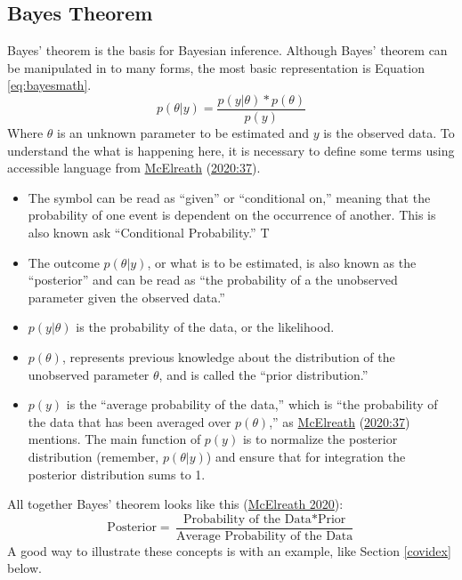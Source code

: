 \documentclass[12pt,twoside]{reedthesis}
\begin{document}
\hypertarget{bayesthe}{%
\subsection{Bayes Theorem}\label{bayesthe}}

Bayes' theorem is the basis for Bayesian inference. Although Bayes' theorem can be manipulated in to many forms, the most basic representation is Equation \eqref{eq:bayesmath}.
\begin{equation}
p(\theta|y) = \frac{ p(y|\theta) * p(\theta)}{p(y)}
\label{eq:bayesmath}
\end{equation}
Where \(\theta\) is an unknown parameter to be estimated and \(y\) is the observed data. To understand the what is happening here, it is necessary to define some terms using accessible language from \protect\hyperlink{ref-mcelreath2020}{McElreath} (\protect\hyperlink{ref-mcelreath2020}{2020:37}).
\begin{itemize}
\item
  The symbol \textbar{} can be read as ``given'' or ``conditional on,'' meaning that the probability of one event is dependent on the occurrence of another. This is also known ask ``Conditional Probability.'' T
\item
  The outcome \(p(\theta|y)\), or what is to be estimated, is also known as the ``posterior'' and can be read as ``the probability of a the unobserved parameter given the observed data.''
\item
  \(p(y|\theta)\) is the probability of the data, or the likelihood.
\item
  \(p(\theta)\), represents previous knowledge about the distribution of the unobserved parameter \(\theta\), and is called the ``prior distribution.''
\item
  \(p(y)\) is the ``average probability of the data,'' which is ``the probability of the data that has been averaged over \(p(\theta)\),'' as \protect\hyperlink{ref-mcelreath2020}{McElreath} (\protect\hyperlink{ref-mcelreath2020}{2020:37}) mentions. The main function of \(p(y)\) is to normalize the posterior distribution (remember, \(p(\theta|y)\)) and ensure that for integration the posterior distribution sums to 1.
\end{itemize}
All together Bayes' theorem looks like this (\protect\hyperlink{ref-mcelreath2020}{McElreath 2020}):
\begin{equation}
\text{Posterior} = \frac{\text{Probability of the Data} * \text{Prior}}{\text{Average Probability of the Data}}
\label{eq:bayesword}
\end{equation}
A good way to illustrate these concepts is with an example, like Section \ref{covidex} below.
\end{document}
